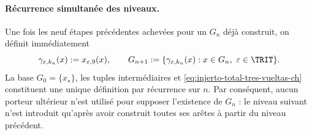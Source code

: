 \paragraph{Récurrence simultanée des niveaux.}
Une fois les neuf étapes précédentes achevées pour un \(G_n\) déjà construit,
on définit immédiatement
\begin{equation}
 \gamma_{\varepsilon,k_n}(x):=x_{\varepsilon,9}(x),\qquad
 G_{n+1}:=\{\gamma_{\varepsilon,k_n}(x):
       x\in G_n,\ \varepsilon\in\TRIT\}.
 \label{eq:injerto-total-tres-vueltas-ch}
\end{equation}
\label{eq:tres-vueltas-tpk-ch}
La base \(G_0=\{x_\star\}\), les tuples intermédiaires et
\eqref{eq:injerto-total-tres-vueltas-ch} constituent une unique définition par
récurrence sur \(n\). Par conséquent, aucun porteur ultérieur n’est utilisé pour
supposer l’existence de \(G_n\) : le niveau suivant n’est introduit
qu’après avoir construit toutes ses arêtes à partir du niveau précédent.

